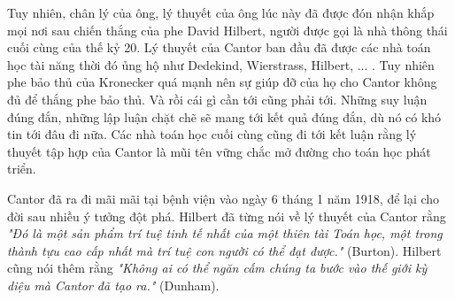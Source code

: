Tuy nhiên, chân lý của ông, lý thuyết của ông lúc này đã được đón nhận
khắp mọi nơi sau chiến thắng của phe David Hilbert, người được gọi là
nhà thông thái cuối cùng của thế kỷ 20. Lý thuyết của Cantor ban đầu đã
được các nhà toán học tài năng thời đó ủng hộ như Dedekind, Wierstrass, Hilbert, 
... . Tuy nhiên phe bảo thủ của Kronecker quá mạnh nên sự giúp đỡ của
họ cho Cantor không đủ để thắng phe bảo thủ. Và rồi cái gì cần tới cũng phải
tới. Những suy luận đúng đắn, những lập luận chặt chẽ sẽ mang tới kết quả
đúng đắn, dù nó có khó tin tới đâu đi nữa. Các nhà toán học cuối cùng cũng 
đi tới kết luận rằng lý thuyết tập hợp của Cantor là mũi tên vững chắc
mở đường cho toán học phát triển.

Cantor đã ra đi mãi mãi tại bệnh viện vào ngày 6 tháng 1 năm 1918, để
lại cho đời sau nhiều ý tưởng đột phá. Hilbert đã từng nói về lý thuyết 
của Cantor rằng \textit{"Đó là một sản phẩm trí tuệ tinh tế nhất của một 
thiên tài Toán học, một trong thành tựu cao cấp nhất mà trí tuệ con người
có thể đạt được."} (Burton). Hilbert cũng nói thêm rằng \textit{
    "Không ai có thể ngăn cấm chúng ta bước vào thế giới kỳ diệu
    mà Cantor đã tạo ra."
}(Dunham).